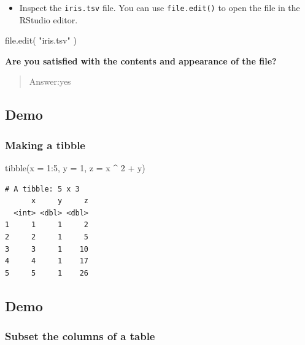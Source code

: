 \documentclass[
  letterpaper,
  DIV=11,
  numbers=noendperiod]{scrartcl}
\newenvironment{Shaded}{\begin{snugshade}}{\end{snugshade}}
\newcommand{\AttributeTok}[1]{\textcolor[rgb]{0.40,0.45,0.13}{#1}}
\newcommand{\DecValTok}[1]{\textcolor[rgb]{0.68,0.00,0.00}{#1}}
\newcommand{\FunctionTok}[1]{\textcolor[rgb]{0.28,0.35,0.67}{#1}}
\newcommand{\NormalTok}[1]{\textcolor[rgb]{0.00,0.23,0.31}{#1}}
\newcommand{\SpecialCharTok}[1]{\textcolor[rgb]{0.37,0.37,0.37}{#1}}
\newcommand{\StringTok}[1]{\textcolor[rgb]{0.13,0.47,0.30}{#1}}
\providecommand{\tightlist}{%
  \setlength{\itemsep}{0pt}\setlength{\parskip}{0pt}}\usepackage{longtable,booktabs,array}
\begin{document}
\begin{itemize}
\tightlist
\item
  Inspect the \texttt{iris.tsv} file. You can use \texttt{file.edit()}
  to open the file in the RStudio editor.
\end{itemize}

\begin{Shaded}
\begin{Highlighting}[]
\FunctionTok{file.edit}\NormalTok{( }\StringTok{"iris.tsv"}\NormalTok{ )}
\end{Highlighting}
\end{Shaded}

\textbf{Are you satisfied with the contents and appearance of the file?}

\begin{quote}
Answer:yes
\end{quote}

\subsection{Demo}\label{demo-3}

\subsubsection{Making a tibble}\label{making-a-tibble}

\begin{Shaded}
\begin{Highlighting}[]
\FunctionTok{tibble}\NormalTok{(}\AttributeTok{x =} \DecValTok{1}\SpecialCharTok{:}\DecValTok{5}\NormalTok{, }\AttributeTok{y =} \DecValTok{1}\NormalTok{, }\AttributeTok{z =}\NormalTok{ x }\SpecialCharTok{\^{}} \DecValTok{2} \SpecialCharTok{+}\NormalTok{ y)}
\end{Highlighting}
\end{Shaded}

\begin{verbatim}
# A tibble: 5 x 3
      x     y     z
  <int> <dbl> <dbl>
1     1     1     2
2     2     1     5
3     3     1    10
4     4     1    17
5     5     1    26
\end{verbatim}

\subsection{Demo}\label{demo-4}

\subsubsection{Subset the columns of a
table}\label{subset-the-columns-of-a-table}
\end{document}
